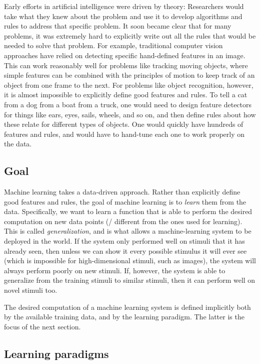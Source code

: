 Early efforts in artificial intelligence were driven by theory:
Researchers would take what they knew about the problem
and use it to develop algorithms and rules to address that specific problem.
It soon became clear that for many problems,
it was extremely hard to explicitly write out
all the rules that would be needed to solve that problem.
For example, traditional computer vision approaches have relied on
detecting specific hand-defined features in an image.
This can work reasonably well for problems like tracking moving objects,
where simple features can be combined with the principles of motion
to keep track of an object from one frame to the next.
For problems like object recognition, however,
it is almost impossible to explicitly define good features and rules.
To tell a cat from a dog from a boat from a truck,
one would need to design feature detectors for things like ears, eyes,
sails, wheels, and so on,
and then define rules about how these relate for different types of objects.
One would quickly have hundreds of features and rules,
and would have to hand-tune each one to work properly on the data.


\subsection{Goal}

Machine learning takes a data-driven approach.
Rather than explicitly define good features and rules,
the goal of machine learning is to \emph{learn} them from the data.
Specifically, we want to learn a function
that is able to perform the desired computation on new data points
(\ie/ different from the ones used for learning).
This is called \emph{generalization},
and is what allows a machine-learning system to be deployed in the world.
If the system only performed well on stimuli that it has already seen,
then unless we can show it every possible stimulus it will ever see
(which is impossible for high-dimensional stimuli, such as images),
the system will always perform poorly on new stimuli.
If, however, the system is able to generalize
from the training stimuli to similar stimuli,
then it can perform well on novel stimuli too.

The desired computation of a machine learning system
is defined implicitly both by the available training data,
and by the learning paradigm.
The latter is the focus of the next section.


\subsection{Learning paradigms}

